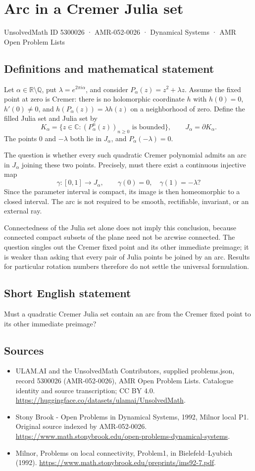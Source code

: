\documentclass[11pt,a4paper]{article}
\begin{document}
\section*{Arc in a Cremer Julia set}\label{5300026}
{\small UnsolvedMath ID 5300026 · AMR-052-0026 · Dynamical Systems · AMR Open Problem Lists}
\subsection{Definitions and mathematical statement}
Let $\alpha\in\mathbb R\setminus\mathbb Q$, put
$\lambda=e^{2\pi i\alpha}$, and consider $P_\alpha(z)=z^2+\lambda z$.
Assume the fixed point at zero is Cremer: there is no holomorphic
coordinate $h$ with $h(0)=0$, $h'(0)\ne0$, and
$h(P_\alpha(z))=\lambda h(z)$ on a neighborhood of zero.
Define the filled Julia set and Julia set by
\[
 K_\alpha=\{z\in\mathbb C:(P_\alpha^n(z))_{n\ge0}
                     \text{ is bounded}\},\qquad
 J_\alpha=\partial K_\alpha.
\]
The points $0$ and $-\lambda$ both lie in $J_\alpha$, and
$P_\alpha(-\lambda)=0$.

The question is whether every such quadratic Cremer polynomial admits
an arc in $J_\alpha$ joining these two points. Precisely, must there
exist a continuous injective map
\[
 \gamma:[0,1]\to J_\alpha,\qquad
 \gamma(0)=0,\quad\gamma(1)=-\lambda?
\]
Since the parameter interval is compact, its image is then homeomorphic
to a closed interval. The arc is not required to be smooth, rectifiable,
invariant, or an external ray.

Connectedness of the Julia set alone does not imply this conclusion,
because connected compact subsets of the plane need not be arcwise
connected. The question singles out the Cremer fixed point and its
other immediate preimage; it is weaker than asking that every pair of
Julia points be joined by an arc. Results for particular rotation
numbers therefore do not settle the universal formulation.
\subsection{Short English statement}
Must a quadratic Cremer Julia set contain an arc from the Cremer fixed point to its other immediate preimage?
\subsection{Sources}
\begin{itemize}
\item[S1] ULAM.AI and the UnsolvedMath Contributors, supplied problems.json, record 5300026 (AMR-052-0026), AMR Open Problem Lists. Catalogue identity and source transcription; CC BY 4.0.
\url{https://huggingface.co/datasets/ulamai/UnsolvedMath}.
\item[S2] Stony Brook - Open Problems in Dynamical Systems, 1992, Milnor local P1. Original source indexed by AMR-052-0026.
\url{https://www.math.stonybrook.edu/open-problems-dynamical-systems}.
\item[S3] Milnor, Problems on local connectivity, Problem1, in Bielefeld–Lyubich (1992).
\url{https://www.math.stonybrook.edu/preprints/ims92-7.pdf}.
\end{itemize}
\end{document}

